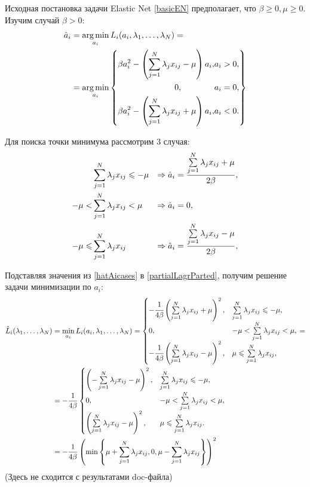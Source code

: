 Исходная постановка задачи Elastic Net \ref{basicEN} предполагает, что $\beta\ge0, \mu\ge0.$ Изучим случай $\beta > 0:$ 
\begin{equation}
	\label{hatAi}
	\begin{split}
		\hat a_i &= \mathop{\mbox{arg\ \!min}}\limits_{a_i} L_i(a_i,\lambda_{1},\ldots,\lambda_{N}) = \\
				 &=	\mathop{\mbox{arg\ \!min}}\limits_{a_i} \left\{
				 	\begin{aligned}
						\beta a_i^2 - \left(\sum\limits_{j=1}^N\lambda_jx_{ij}-\mu\right)a_i, &a_i > 0,\\
						0, \qquad\qquad &a_i = 0,\\
						\beta a_i^2 - \left(\sum\limits_{j=1}^N\lambda_jx_{ij}+\mu\right)a_i, &a_i < 0.\\
					\end{aligned}	
					\right\}
	\end{split}
\end{equation}

Для поиска точки минимума рассмотрим 3 случая:
\begin{align}
	\label{hatAicases}
	         &\sum\limits_{j=1}^N\lambda_jx_{ij} \leqslant -\mu 	&\Rightarrow \hat a_i &= \frac{\sum\limits_{j=1}^N\lambda_jx_{ij}+\mu}{2\beta}, \\
	-\mu <   &\sum\limits_{j=1}^N\lambda_jx_{ij} < \mu 	&\Rightarrow \hat a_i &= 0, \\
	-\mu \leqslant &\sum\limits_{j=1}^N\lambda_jx_{ij} 			&\Rightarrow \hat a_i &= \frac{\sum\limits_{j=1}^N\lambda_jx_{ij}-\mu}{2\beta},
\end{align}


Подставляя значения из \ref{hatAicases} в \ref{partialLagrParted}, получим решение задачи минимизации по $a_i$:
\begin{align}
	\label{hatLiSquared}
	\begin{split}
		\hat L_i(\lambda_{1},\ldots,\lambda_{N}) &= \mathop{\mbox{min}}\limits_{a_i}L_i(a_i, \lambda_{1},\ldots,\lambda_{N}) =
		\begin{cases}
			-\cfrac1{4\beta}\left(\sum\limits_{j=1}^N\lambda_jx_{ij}+\mu\right)^2, &\sum\limits_{j=1}^N\lambda_jx_{ij} \leqslant -\mu,\\
			0, 										&-\mu < \sum\limits_{j=1}^N\lambda_jx_{ij} < \mu,\\
			-\cfrac1{4\beta}\left(\sum\limits_{j=1}^N\lambda_jx_{ij}-\mu\right)^2, &\mu\leqslant\sum\limits_{j=1}^N\lambda_jx_{ij},
		\end{cases} = \\
		&= -\frac1{4\beta}
		\begin{cases}
			\left(-\sum\limits_{j=1}^N\lambda_jx_{ij}-\mu\right)^2, &\sum\limits_{j=1}^N\lambda_jx_{ij} \leqslant -\mu,\\
			0, 	 					&-\mu < \sum\limits_{j=1}^N\lambda_jx_{ij} < \mu,\\
			\left(\sum\limits_{j=1}^N\lambda_jx_{ij}-\mu\right)^2, &\mu\leqslant\sum\limits_{j=1}^N\lambda_jx_{ij}.
		\end{cases} 	\\
		&= -\frac1{4\beta} \left(\mathop{\mbox{min}}\limits\left\{\mu + \sum\limits_{j=1}^N\lambda_jx_{ij}, 0, \mu-\sum\limits_{j=1}^N\lambda_jx_{ij}\right\}\right)^2
	\end{split}
\end{align}
(Здесь не сходится с результатами doc-файла)


